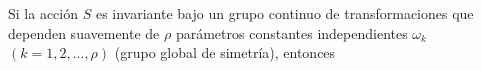 \documentclass[preview]{standalone}
\begin{document}
\begin{justify}
Si la acción $S$ es invariante bajo un grupo continuo de transformaciones que dependen suavemente de $\rho$ parámetros constantes independientes $\omega_k$ $(k=1,2,...,\rho)$ (grupo global de simetría), entonces
\end{justify}
\end{document}
